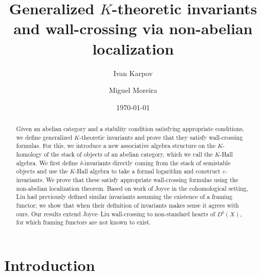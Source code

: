 \documentclass[12pt]{amsart}
\title[$K$-theoretic wall-crossing]{Generalized $K$-theoretic invariants and wall-crossing via non-abelian localization}
\date{\today}
\author[I. Karpov]{Ivan Karpov}
\author[M. Moreira]{Miguel Moreira}
\theoremstyle{definition}
\newcommand{\1}{\mathbf 1}
\begin{document}

\begin{abstract}
Given an abelian category and a stability condition satisfying appropriate conditions, we define generalized $K$-theoretic invariants and prove that they satisfy wall-crossing formulas. For this, we introduce a new associative algebra structure on the $K$-homology of the stack of objects of an abelian category, which we call the $K$-Hall algebra. We first define $\delta$-invariants directly coming from the stack of semistable objects and use the $K$-Hall algebra to take a formal logarithm and construct $\varepsilon$-invariants. We prove that these satisfy appropriate wall-crossing formulas using the non-abelian localization theorem. Based on work of Joyce in the cohomological setting, Liu had previously defined similar invariants assuming the existence of a framing functor; we show that when their definition of invariants makes sense it agrees with ours. Our results extend Joyce--Liu wall-crossing to non-standard hearts of $D^b(X)$, for which framing functors are not known to exist.
\end{abstract}


\maketitle

\setcounter{tocdepth}{1} 

\tableofcontents


\section{Introduction}
\label{sec: intro}
\end{document}
